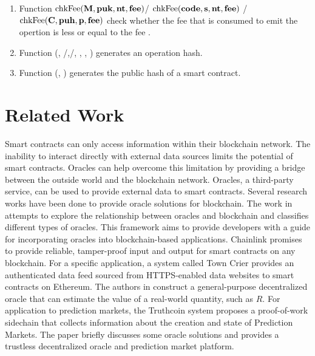 \documentclass[a4paper]{llncs}
\begin{document}
\begin{enumerate}
    \item Function  $\textup{chkFee} (\textbf{M}, \textbf{puk},\textbf{nt}, \textbf{fee})$/ $\textup{chkFee} (\textbf{code}, \textbf{s}, \textbf{nt}, \textbf{fee})$ / $\textup{chkFee} (\textbf{C}, \textbf{puh}, \textbf{p}, \textbf{fee})$ check whether the fee that is consumed to emit the opertion is less or equal to the fee \MTEZ. 
    \item Function \GENERATEOPH (\PUK, {\ADDR /\CODE},{\INIT /\PARAMETER}, \NTEZ, \MTEZ,  \TIME) generates an operation hash.

    \item Function \GENERATEHASH (\CODE, \TIME)  generates the public hash of a smart contract.
    
\end{enumerate}

\section{Related Work}
\label{sec:related work}
Smart contracts can only access information within their blockchain network. The inability to interact directly with external data sources limits the potential of smart contracts. Oracles \cite{oracle-patterns}\cite{call-action-oracle}\cite{oracles-study} can help overcome this limitation by providing a bridge between the outside world and the blockchain network. Oracles, a third-party service, can be used to provide external data to smart contracts. Several research works have been done to provide oracle solutions for blockchain. The work in \cite{blockchain-oracles} attempts to explore the relationship between oracles and blockchain and classifies different types of oracles. This framework aims to provide developers with a guide for incorporating oracles into blockchain-based applications. Chainlink \cite{chainlink-whitepaper} promises to provide reliable, tamper-proof input and output for smart contracts on any blockchain. For a specific application, a system called Town Crier \cite{town-crier} provides an authenticated data feed sourced from HTTPS-enabled data websites to smart contracts on Ethereum. The authors in \cite{oracle-real-value} construct a general-purpose decentralized oracle that can estimate the value of a real-world quantity, such as $R$. 
For application to prediction markets, the Truthcoin \cite{truthcoin-whitepaper} system proposes a proof-of-work sidechain that collects information about the creation and state of Prediction Markets. The paper \cite{astraea} briefly discusses some oracle solutions and provides a trustless decentralized oracle and prediction market platform. 
\end{document}
